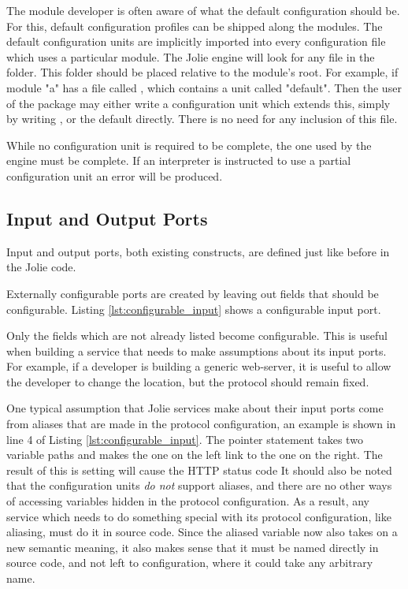 The module developer is often aware of what the default configuration should
be.  For this, default configuration profiles can be shipped along the modules.
The default configuration units are implicitly imported into every
configuration file which uses a particular module.  The Jolie engine will look
for any  file in the  folder. This folder should be
placed relative to the module's root. For example, if module "a" has a file
called , which contains a unit called "default".
Then the user of the package may either write a configuration unit which
extends this, simply by writing , or the default directly. There is no need for any
    inclusion of this file.

While no configuration unit is required to be complete, the one used by the
engine must be complete. If an interpreter is instructed to use a partial
configuration unit an error will be produced.

\subsection{Input and Output Ports}

Input and output ports, both existing constructs, are defined just like before
in the Jolie code.

Externally configurable ports are created by leaving out fields that should be
configurable. Listing \ref{lst:configurable_input} shows a configurable input
port.

Only the fields which are not already listed become configurable. This is
useful when building a service that needs to make assumptions about its input
ports. For example, if a developer is building a generic web-server, it is
useful to allow the developer to change the location, but the protocol should
remain fixed.

One typical assumption that Jolie services make about their input ports come
from aliases that are made in the protocol configuration, an example is shown
in line 4 of Listing \ref{lst:configurable_input}. The pointer statement takes
two variable paths and makes the one on the left link to the one on the right.
The result of this is setting  will cause the HTTP status code
It should also be noted that the configuration units \emph{do not} support
aliases, and there are no other ways of accessing variables hidden in the
protocol configuration. As a result, any service which needs to do something
special with its protocol configuration, like aliasing, must do it in source
code. Since the aliased variable now also takes on a new semantic meaning, it
also makes sense that it must be named directly in source code, and not left to
configuration, where it could take any arbitrary name.

